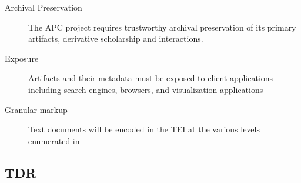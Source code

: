 \begin{description}
  \item[Archival Preservation]The APC project requires trustworthy archival preservation of its primary artifacts, derivative scholarship and interactions.
  \item[Exposure] Artifacts and their metadata must be exposed to client applications including search engines, browsers, and visualization applications
  \item[Granular markup] Text documents will be encoded in the TEI at the various levels enumerated in \cite{tei_sig_on_libraries_best_2011} 
\end{description}

\subsection{TDR}

